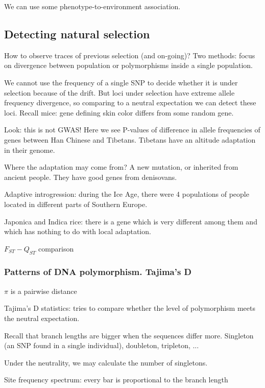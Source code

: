 \documentclass[main.tex]{subfiles}
\begin{document}
We can use some phenotype-to-environment association.

\subsection{Detecting natural selection}

How to observe traces of previous selection (and on-going)?
Two methods: focus on divergence between population or polymorphisms inside a single population.

We cannot use the frequency of a single SNP to decide whether it is under selection because of the drift.
But loci under selection have extreme allele frequency divergence, so comparing to a neutral expectation we can detect these loci.
Recall mice: gene defining skin color differs from some random gene.

Look: this is not GWAS!
Here we see P-values of difference in allele frequencies of genes between Han Chinese and Tibetans.
Tibetans have an altitude adaptation in their genome.

Where the adaptation may come from?
A new mutation, or inherited from ancient people.
They have good genes from denisovans.

Adaptive introgression: during the Ice Age, there were 4 populations of people located in different parts of Southern Europe.

Japonica and Indica rice:
there is a gene which is very different among them and which has nothing to do with local adaptation. %

$ F_{ST} - Q_{ST} $ comparison

\subsubsection{Patterns of DNA polymorphism. Tajima's D}

$ \pi $ is a pairwise distance

Tajima's D statistics: tries to compare whether the level of polymorphism meets the neutral expectation.

Recall that branch lengths are bigger when the sequences differ more.
Singleton (an SNP found in a single individual), doubleton, tripleton, ...

Under the neutrality, we may calculate the number of singletons.

Site frequency spectrum: every bar is proportional to the branch length
\end{document}
